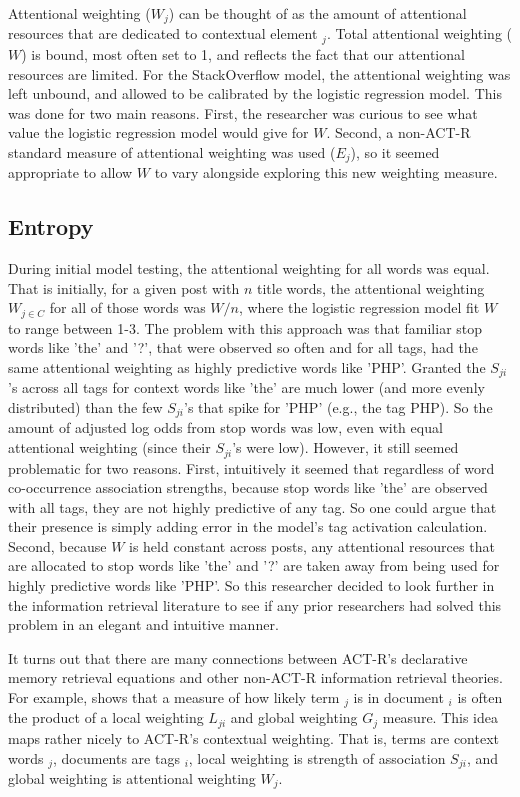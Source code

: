 \documentclass[10pt,letterpaper]{article}
\begin{document}
Attentional weighting ($W_{j}$) can be thought of as the amount of attentional resources that are dedicated to contextual element $_{j}$.
Total attentional weighting ($W$) is bound, most often set to 1, and reflects the fact that our attentional resources are limited.
For the StackOverflow model, the attentional weighting was left unbound, and allowed to be calibrated by the logistic regression model.
This was done for two main reasons.
First, the researcher was curious to see what value the logistic regression model would give for $W$.
Second, a non-ACT-R standard measure of attentional weighting was used ($E_{j}$), so it seemed appropriate to allow $W$ to vary alongside exploring this new weighting measure. 

\subsection{Entropy}

During initial model testing, the attentional weighting for all words was equal.
That is initially, for a given post with $n$ title words, the attentional weighting $W_{j\in C}$ for all of those words was $W/n$, where the logistic regression model fit $W$ to range between 1-3.
The problem with this approach was that familiar stop words like 'the' and '?', that were observed so often and for all tags, had the same attentional weighting as highly predictive words like 'PHP'.
Granted the $S_{ji}$'s across all tags for context words like 'the' are much lower (and more evenly distributed) than the few $S_{ji}$'s that spike for 'PHP' (e.g., the tag PHP).
So the amount of adjusted log odds from stop words was low, even with equal attentional weighting (since their $S_{ji}$'s were low).
However, it still seemed problematic for two reasons.
First, intuitively it seemed that regardless of word co-occurrence association strengths, because stop words like 'the' are observed with all tags, they are not highly predictive of any tag.
So one could argue that their presence is simply adding error in the model's tag activation calculation.
Second, because $W$ is held constant across posts, any attentional resources that are allocated to stop words like 'the' and '?' are taken away from being used for highly predictive words like 'PHP'.
So this researcher decided to look further in the information retrieval literature to see if any prior researchers had solved this problem in an elegant and intuitive manner.

It turns out that there are many connections between ACT-R's declarative memory retrieval equations and other non-ACT-R information retrieval theories.
For example, \cite{Dumais1991} shows that a measure of how likely term ${_j}$ is in document ${_i}$ is often the product of a local weighting $L_{ji}$ and global weighting $G_{j}$ measure.
This idea maps rather nicely to ACT-R's contextual weighting.
That is, terms are context words ${_j}$, documents are tags ${_i}$, local weighting is strength of association $S_{ji}$, and global weighting is attentional weighting $W_{j}$.
\end{document}
